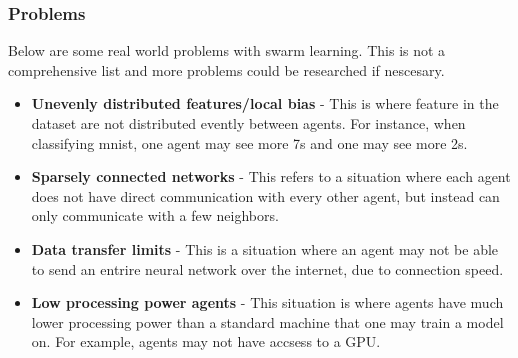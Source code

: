 \documentclass[12pt,a4paper,titlepage]{report}
\begin{document}
	\subsubsection{Problems}
	Below are some real world problems with swarm learning. This is not a comprehensive list and more problems could be researched if nescesary.
	\begin{itemize}
		\item \textbf{Unevenly distributed features/local bias} - This is where feature in the dataset are not distributed evently between agents. For instance, when classifying mnist, one agent may see more 7s and one may see more 2s.
		\item \textbf{Sparsely connected networks} - This refers to a situation where each agent does not have direct communication with every other agent, but instead can only communicate with a few neighbors.
		\item \textbf{Data transfer limits} - This is a situation where an agent may not be able to send an entrire neural network over the internet, due to connection speed.
		\item \textbf{Low processing power agents} - This situation is where agents have much lower processing power than a standard machine that one may train a model on. For example, agents may not have accsess to a GPU.
	\end{itemize}	
	
\end{document}
